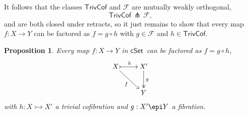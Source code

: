 \documentclass[11pt]{article}
\newcommand{\cSet}{\ensuremath{\mathsf{cSet}}}
\newcommand{\mono}{\ensuremath{\rightarrowtail}}
\newtheorem{proposition}[theorem]{Proposition}
\theoremstyle{remark}
\theoremstyle{definition}
\begin{document}
It follows that the classes $\mathsf{TrivCof}$ and $\mathcal{F}$ are mutually weakly orthogonal,
\[
\mathsf{TrivCof}\, {\pitchfork}\, \mathcal{F},
\]
and are both closed under retracts, so it just remains to show that every map $f: X\to Y$ can be factored as $f  = g\circ h$ with $g\in \mathcal{F}$ and $h\in \mathsf{TrivCof}$.

\begin{proposition}
Every map $f: X\to Y$ in \cSet\ can be factored as $f  = g\circ h$,
\begin{equation}%
\xymatrix{
X \ar[rd]_{f} \ar@{>->}[r]^h & X'\ar@{->>}[d]^g\\
& Y
}
\end{equation}
with $h: X\mono X'$ a trivial cofibration and $g: X'\epi Y$ a fibration.
\end{proposition}
\end{document}
